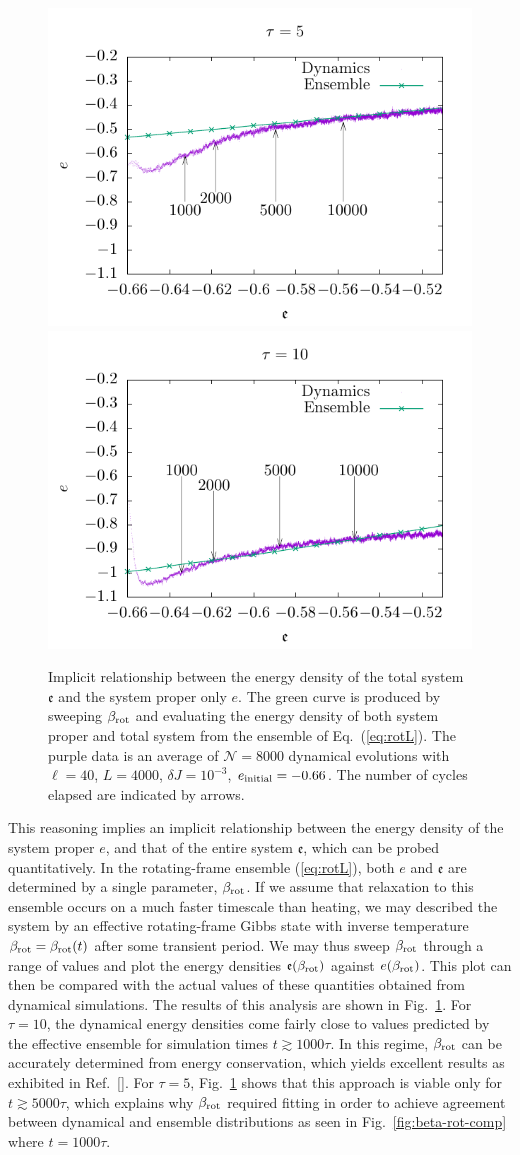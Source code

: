 \documentclass[aps,pre,twocolumn,notitlepage,floats,10pt]{revtex4-1}
\begin{document}
\begin{figure}[!ht]
  \includegraphics[width=0.45\linewidth]{figs/fig-9-drift-tau-5.0.pdf}
  \includegraphics[width=0.45\linewidth]{figs/fig-9-drift-tau-10.0.pdf}
  \caption{
    Implicit relationship between the energy density of the
    total system $\mathfrak{e}$ and the system proper only $e$.
    The green curve is produced by sweeping $\beta_{\rm rot}$ and
    evaluating the energy density of both system proper and total system
    from the ensemble of Eq.~(\ref{eq:rotL}).
    The purple data is an average of $\mathcal{N} = 8000$ dynamical evolutions
    with $\ell=40$, $L=4000$, $\delta J = 10^{-3}$, $e_{\rm initial}=-0.66$.
    The number of cycles elapsed are indicated by arrows.
  } \label{fig:drift}
\end{figure}
This reasoning implies an implicit relationship between the energy density of
the system proper $e$, and that of the entire system $\mathfrak{e}$, which can
be probed quantitatively.
In the rotating-frame ensemble (\ref{eq:rotL}), both $e$ and $\mathfrak{e}$ are
determined by a single parameter, $\beta_{\rm rot}$.
If we assume that relaxation to this ensemble occurs on a much faster timescale
than heating, we may described the system by an effective rotating-frame Gibbs
state with inverse temperature $\beta_{\rm rot} = \beta_{\rm rot}(t)$ after
some transient period.
We may thus sweep $\beta_{\rm rot}$ through a range of values and plot the
energy densities $\mathfrak{e}(\beta_{\rm rot})$ against $e(\beta_{\rm rot})$.
This plot can then be compared with the actual values of these quantities
obtained from dynamical simulations.
The results of this analysis are shown in Fig.~\ref{fig:drift}.  For $\tau=10$,
the dynamical energy densities come fairly close to values predicted by the
effective ensemble for simulation times $t\gtrsim 1000\tau$.
In this regime, $\beta_{\rm rot}$ can be accurately determined from energy
conservation, which yields excellent results as exhibited in
Ref.~[].
For $\tau=5$, Fig.~\ref{fig:drift} shows that this approach is viable only for
$t\gtrsim 5000\tau$, which explains why $\beta_{\rm rot}$ required fitting in
order to achieve agreement between dynamical and ensemble distributions as seen
in Fig.~\ref{fig:beta-rot-comp} where $t=1000\tau$.
\end{document}
